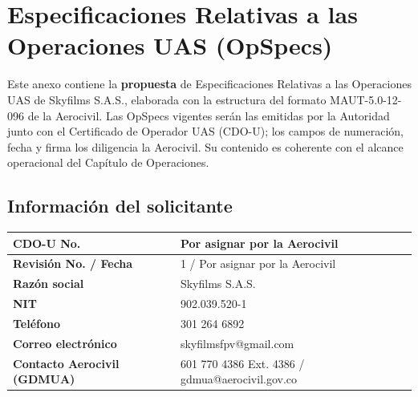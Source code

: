 \chapter{Especificaciones Relativas a las Operaciones UAS (OpSpecs)}
\label{anexo:opspecs}
\label{inicio_anexo}

Este anexo contiene la \textbf{propuesta} de Especificaciones Relativas a las Operaciones UAS de Skyfilms S.A.S., elaborada con la estructura del formato MAUT-5.0-12-096 de la Aerocivil. Las OpSpecs vigentes serán las emitidas por la Autoridad junto con el Certificado de Operador UAS (CDO-U); los campos de numeración, fecha y firma los diligencia la Aerocivil. Su contenido es coherente con el alcance operacional del Capítulo de Operaciones.

\section{Información del solicitante}
\begin{table}[H]
    \centering
    \renewcommand{\arraystretch}{1.2}
    \begin{tabular}{|p{5.5cm}|p{9cm}|}
        \hline
        \textbf{CDO-U No.} & Por asignar por la Aerocivil \\ \hline
        \textbf{Revisión No. / Fecha} & 1 / Por asignar por la Aerocivil \\ \hline
        \textbf{Razón social} & Skyfilms S.A.S. \\ \hline
        \textbf{NIT} & 902.039.520-1 \\ \hline
        \textbf{Teléfono} & 301 264 6892 \\ \hline
        \textbf{Correo electrónico} & skyfilmsfpv@gmail.com \\ \hline
        \textbf{Contacto Aerocivil (GDMUA)} & 601 770 4386 Ext. 4386 / gdmua@aerocivil.gov.co \\ \hline
    \end{tabular}
\end{table}

